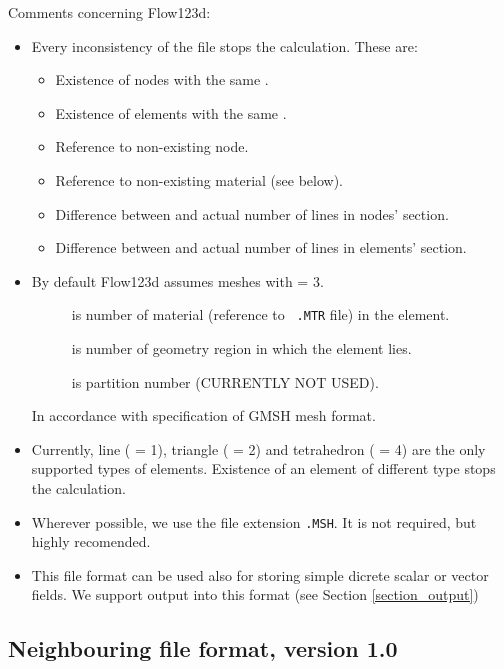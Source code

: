 Comments concerning Flow123d:
\begin{itemize}
  \item Every inconsistency of the file stops the calculation.
    These are:
      \begin{itemize}
        \item Existence of nodes with the same .
        \item Existence of elements with the same .
        \item Reference to non-existing node.
        \item Reference to non-existing material (see below).
        \item Difference between  and actual number of
          lines in nodes' section.
        \item Difference between  and actual number of
          lines in elements' section.
      \end{itemize}
  \item By default Flow123d assumes meshes with  = 3. 
    \begin{description}
    \item[] is number of material (reference to {\tt
    .MTR} file) in the element.
    \item[] is number of geometry region in which the element lies. 
    \item[] is partition number (CURRENTLY NOT USED).
    \end{description}
    In accordance with specification of GMSH mesh format.
  \item Currently, line ( = 1), triangle ( = 2) and
    tetrahedron ( = 4) are the only supported types
    of elements. Existence of an element of different type stops the calculation.
  \item Wherever possible, we use the file extension {\tt .MSH}. It is not
    required, but highly recomended.
  \item This file format can be used also for storing simple dicrete scalar or vector fields. We support output
   into this format (see Section \ref{section_output})
\end{itemize}

\subsection{Neighbouring file format, version 1.0}
\label{ngh_file}

